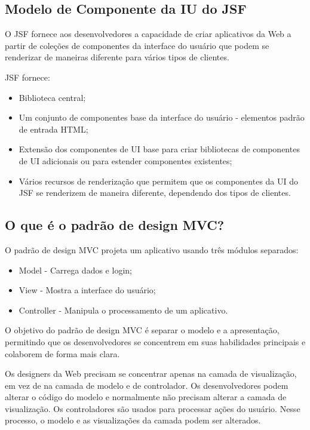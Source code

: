 \documentclass[	DIV=calc,%
							paper=a4,%
							fontsize=12pt,%
							onecolumn]{scrartcl}	 					%
\begin{document}
\subsection{Modelo de Componente da IU do JSF}

O JSF fornece aos desenvolvedores a capacidade de criar aplicativos da Web a partir de coleções de componentes da interface do usuário que podem se renderizar de maneiras diferente para vários tipos de clientes.

JSF fornece:
\begin{itemize}
\item Biblioteca central;
\item Um conjunto de componentes base da interface do usuário - elementos padrão de entrada HTML;
\item Extensão dos componentes de UI base para criar bibliotecas de componentes de UI adicionais ou para estender componentes existentes;
\item Vários recursos de renderização que permitem que os componentes da UI do JSF se renderizem de maneira diferente, dependendo dos tipos de clientes.
\end{itemize}

\subsection{O que é o padrão de design MVC?}

O padrão de design MVC projeta um aplicativo usando três módulos separados:
\begin{itemize}
\item Model - Carrega dados e login;
\item View - Mostra a interface do usuário;
\item Controller - Manipula o processamento de um aplicativo.
\end{itemize}

O objetivo do padrão de design MVC é separar o modelo e a apresentação, permitindo que os desenvolvedores se concentrem em suas habilidades principais e colaborem de forma mais clara.

Os designers da Web precisam se concentrar apenas na camada de visualização, em vez de na camada de modelo e de controlador. Os desenvolvedores podem alterar o código do modelo e normalmente não precisam alterar a camada de visualização. Os controladores são usados para processar ações do usuário. Nesse processo, o modelo e as visualizações da camada podem ser alterados.
\end{document}
